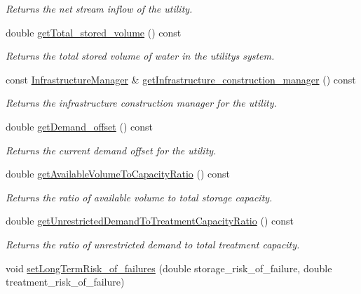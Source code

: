 \begin{DoxyCompactItemize}
\begin{DoxyCompactList}\small\item\em Returns the net stream inflow of the utility. \end{DoxyCompactList}\item 
double \mbox{\hyperlink{classUtility_a5d932aef9e201e824ac681cd6928613a}{get\+Total\+\_\+stored\+\_\+volume}} () const
\begin{DoxyCompactList}\small\item\em Returns the total stored volume of water in the utility\textquotesingle{}s system. \end{DoxyCompactList}\item 
const \mbox{\hyperlink{classInfrastructureManager}{Infrastructure\+Manager}} \& \mbox{\hyperlink{classUtility_a0e8ecb5bbf910de9abecbef06c1662e6}{get\+Infrastructure\+\_\+construction\+\_\+manager}} () const
\begin{DoxyCompactList}\small\item\em Returns the infrastructure construction manager for the utility. \end{DoxyCompactList}\item 
double \mbox{\hyperlink{classUtility_acdd0e90d638d4a127a06787fe427ab59}{get\+Demand\+\_\+offset}} () const
\begin{DoxyCompactList}\small\item\em Returns the current demand offset for the utility. \end{DoxyCompactList}\item 
double \mbox{\hyperlink{classUtility_a70f24df5a7d4346ad0ebccd9b30960d3}{get\+Available\+Volume\+To\+Capacity\+Ratio}} () const
\begin{DoxyCompactList}\small\item\em Returns the ratio of available volume to total storage capacity. \end{DoxyCompactList}\item 
double \mbox{\hyperlink{classUtility_a73afadbbcd2d1a21452937b514d10c34}{get\+Unrestricted\+Demand\+To\+Treatment\+Capacity\+Ratio}} () const
\begin{DoxyCompactList}\small\item\em Returns the ratio of unrestricted demand to total treatment capacity. \end{DoxyCompactList}\item 
void \mbox{\hyperlink{classUtility_a0a5ccfc2e606ef46f1c1a52707fb5071}{set\+Long\+Term\+Risk\+\_\+of\+\_\+failures}} (double storage\+\_\+risk\+\_\+of\+\_\+failure, double treatment\+\_\+risk\+\_\+of\+\_\+failure)

\end{DoxyCompactItemize}
